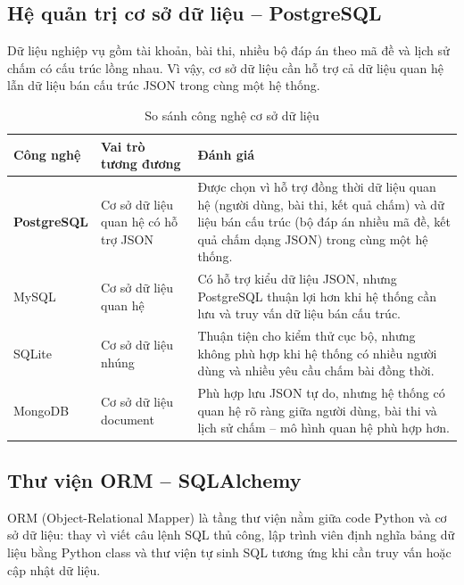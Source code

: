 \subsection{Hệ quản trị cơ sở dữ liệu -- PostgreSQL}

Dữ liệu nghiệp vụ gồm tài khoản, bài thi, nhiều bộ đáp án theo mã đề và lịch sử chấm có cấu trúc lồng nhau. Vì vậy, cơ sở dữ liệu cần hỗ trợ cả dữ liệu quan hệ lẫn dữ liệu bán cấu trúc JSON trong cùng một hệ thống.

\begin{table}[H]
\centering
\caption{So sánh công nghệ cơ sở dữ liệu}
\label{tab:so-sanh-co-so-du-lieu}
\renewcommand{\arraystretch}{1.25}
\small
\begin{tabular}{|L{2.7cm}|L{4.1cm}|L{7.2cm}|}
\hline
\textbf{Công nghệ} & \textbf{Vai trò tương đương} & \textbf{Đánh giá} \\
\hline

\textbf{PostgreSQL} &
Cơ sở dữ liệu quan hệ có hỗ trợ JSON &
Được chọn vì hỗ trợ đồng thời dữ liệu quan hệ (người dùng, bài thi, kết quả chấm) và dữ liệu bán cấu trúc (bộ đáp án nhiều mã đề, kết quả chấm dạng JSON) trong cùng một hệ thống. \\
\hline

MySQL &
Cơ sở dữ liệu quan hệ &
Có hỗ trợ kiểu dữ liệu JSON, nhưng PostgreSQL thuận lợi hơn khi hệ thống cần lưu và truy vấn dữ liệu bán cấu trúc. \\
\hline

SQLite &
Cơ sở dữ liệu nhúng &
Thuận tiện cho kiểm thử cục bộ, nhưng không phù hợp khi hệ thống có nhiều người dùng và nhiều yêu cầu chấm bài đồng thời. \\
\hline

MongoDB &
Cơ sở dữ liệu document &
Phù hợp lưu JSON tự do, nhưng hệ thống có quan hệ rõ ràng giữa người dùng, bài thi và lịch sử chấm -- mô hình quan hệ phù hợp hơn. \\
\hline

\end{tabular}
\normalsize
\end{table}

\subsection{Thư viện ORM -- SQLAlchemy}

ORM (Object-Relational Mapper) là tầng thư viện nằm giữa code Python và cơ sở dữ liệu: thay vì viết câu lệnh SQL thủ công, lập trình viên định nghĩa bảng dữ liệu bằng Python class và thư viện tự sinh SQL tương ứng khi cần truy vấn hoặc cập nhật dữ liệu.

